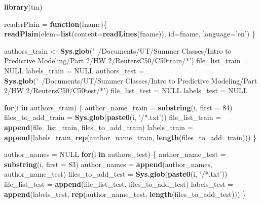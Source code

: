 \documentclass[]{article}
\newenvironment{Shaded}{\begin{snugshade}}{\end{snugshade}}
\newcommand{\KeywordTok}[1]{\textcolor[rgb]{0.13,0.29,0.53}{\textbf{#1}}}
\newcommand{\DataTypeTok}[1]{\textcolor[rgb]{0.13,0.29,0.53}{#1}}
\newcommand{\DecValTok}[1]{\textcolor[rgb]{0.00,0.00,0.81}{#1}}
\newcommand{\StringTok}[1]{\textcolor[rgb]{0.31,0.60,0.02}{#1}}
\newcommand{\OtherTok}[1]{\textcolor[rgb]{0.56,0.35,0.01}{#1}}
\newcommand{\ControlFlowTok}[1]{\textcolor[rgb]{0.13,0.29,0.53}{\textbf{#1}}}
\newcommand{\NormalTok}[1]{#1}
\begin{document}
\begin{Shaded}
\begin{Highlighting}[]
\KeywordTok{library}\NormalTok{(tm) }

\NormalTok{readerPlain =}\StringTok{ }\ControlFlowTok{function}\NormalTok{(fname)\{}
  \KeywordTok{readPlain}\NormalTok{(}\DataTypeTok{elem=}\KeywordTok{list}\NormalTok{(}\DataTypeTok{content=}\KeywordTok{readLines}\NormalTok{(fname)), }
            \DataTypeTok{id=}\NormalTok{fname, }\DataTypeTok{language=}\StringTok{'en'}\NormalTok{) \}}

\NormalTok{authors_train <-}\StringTok{ }\KeywordTok{Sys.glob}\NormalTok{(}\StringTok{'~/Documents/UT/Summer Classes/Intro to Predictive Modeling/Part 2/HW 2/ReutersC50/C50train/*'}\NormalTok{)}
\NormalTok{file_list_train =}\StringTok{ }\OtherTok{NULL}
\NormalTok{labels_train =}\StringTok{ }\OtherTok{NULL}
\NormalTok{authors_test =}\StringTok{ }\KeywordTok{Sys.glob}\NormalTok{(}\StringTok{'~/Documents/UT/Summer Classes/Intro to Predictive Modeling/Part 2/HW 2/ReutersC50/C50test/*'}\NormalTok{)}
\NormalTok{file_list_test =}\StringTok{ }\OtherTok{NULL}
\NormalTok{labels_test =}\StringTok{ }\OtherTok{NULL}

\ControlFlowTok{for}\NormalTok{(i }\ControlFlowTok{in}\NormalTok{ authors_train) \{ }
\NormalTok{  author_name_train =}\StringTok{ }\KeywordTok{substring}\NormalTok{(i, }\DataTypeTok{first =} \DecValTok{84}\NormalTok{)}
\NormalTok{  files_to_add_train =}\StringTok{ }\KeywordTok{Sys.glob}\NormalTok{(}\KeywordTok{paste0}\NormalTok{(i, }\StringTok{'/*.txt'}\NormalTok{))}
\NormalTok{  file_list_train =}\StringTok{ }\KeywordTok{append}\NormalTok{(file_list_train, files_to_add_train)}
\NormalTok{  labels_train =}\StringTok{ }\KeywordTok{append}\NormalTok{(labels_train, }\KeywordTok{rep}\NormalTok{(author_name_train, }\KeywordTok{length}\NormalTok{(files_to_add_train)))}
\NormalTok{\}}

\NormalTok{author_names =}\StringTok{ }\OtherTok{NULL}
\ControlFlowTok{for}\NormalTok{(i }\ControlFlowTok{in}\NormalTok{ authors_test) \{ }
\NormalTok{  author_name_test =}\StringTok{ }\KeywordTok{substring}\NormalTok{(i, }\DataTypeTok{first =} \DecValTok{83}\NormalTok{)}
\NormalTok{  author_names =}\StringTok{ }\KeywordTok{append}\NormalTok{(author_names, author_name_test)}
\NormalTok{  files_to_add_test =}\StringTok{ }\KeywordTok{Sys.glob}\NormalTok{(}\KeywordTok{paste0}\NormalTok{(i, }\StringTok{'/*.txt'}\NormalTok{))}
\NormalTok{  file_list_test =}\StringTok{ }\KeywordTok{append}\NormalTok{(file_list_test, files_to_add_test)}
\NormalTok{  labels_test =}\StringTok{ }\KeywordTok{append}\NormalTok{(labels_test, }\KeywordTok{rep}\NormalTok{(author_name_test, }\KeywordTok{length}\NormalTok{(files_to_add_test)))}
\NormalTok{\}}


\end{Highlighting}
\end{Shaded}
\end{document}
